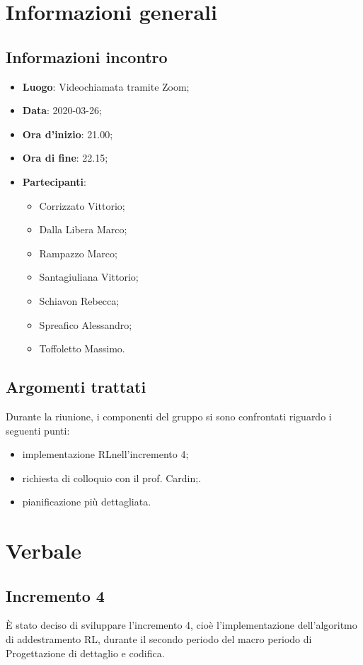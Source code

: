 \section{Informazioni generali}
\subsection{Informazioni incontro}
\begin{itemize}
	\item \textbf{Luogo}: Videochiamata tramite Zoom;
	\item \textbf{Data}: 2020-03-26;
	\item \textbf{Ora d'inizio}: 21.00;
	\item \textbf{Ora di fine}: 22.15;
	\item \textbf{Partecipanti}: \begin{itemize}
		\item Corrizzato Vittorio;
		\item Dalla Libera Marco;
		\item Rampazzo Marco;
		\item Santagiuliana Vittorio;
		\item Schiavon Rebecca;
		\item Spreafico Alessandro;
		\item Toffoletto Massimo.
	\end{itemize}
\end{itemize}
\subsection{Argomenti trattati}
Durante la riunione, i componenti del gruppo si sono confrontati riguardo i seguenti punti:
\begin{itemize}
	\item implementazione RL\glosp nell'incremento 4;
	\item richiesta di colloquio con il prof. Cardin;.	
	\item pianificazione più dettagliata.
\end{itemize}

\section{Verbale}
\subsection{Incremento 4}
È stato deciso di sviluppare l'incremento 4, cioè l'implementazione dell'algoritmo di addestramento RL\glo, durante il secondo periodo del macro periodo di Progettazione di dettaglio e codifica.

